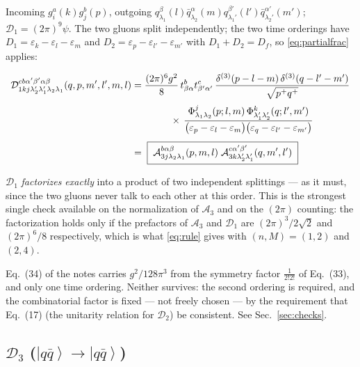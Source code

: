\documentclass[11pt]{article}
\newcommand{\eps}{\varepsilon}
\newcommand{\dthree}{\delta^{(3)}}
\newcommand{\ket}[1]{\left|#1\right\rangle}
\newcommand{\Ph}{\Phi}
\newcommand{\qk}[3]{q^{#1}_{#2}(#3)}
\newcommand{\aqk}[3]{\bar q^{#1}_{#2}(#3)}
\newcommand{\gl}[3]{g^{#1}_{#2}(#3)}
\begin{document}
Incoming $\gl{a}{i}{k}\gl{b}{j}{p}$, outgoing
$\qk{\beta}{\lambda_1}{l}\aqk{\alpha}{\lambda_2}{m}\qk{\beta'}{\lambda_1'}{l'}\aqk{\alpha'}{\lambda_2'}{m'}$;
$\mathcal D_{1}=(2\pi)^{9}\psi$. The two gluons split independently; the two time orderings have
$D_{1}=\eps_{k}-\eps_{l}-\eps_{m}$ and $D_{2}=\eps_{p}-\eps_{l'}-\eps_{m'}$ with
$D_{1}+D_{2}=D_{f}$, so \eqref{eq:partialfrac} applies:

\begin{res}
\begin{align}
\mathcal D^{cb\alpha'\beta'\alpha\beta}_{1kj\lambda_2'\lambda_1'\lambda_2\lambda_1}(q,p,m',l',m,l)
&=\frac{(2\pi)^{6}g^{2}}{8}\,t^{b}_{\beta\alpha}t^{c}_{\beta'\alpha'}\,
\frac{\dthree(p-l-m)\,\dthree(q-l'-m')}{\sqrt{p^{+}q^{+}}}
\nonumber\\[2pt]
&\hspace{1.4cm}\times\,
\frac{\Ph^{j}_{\lambda_1\lambda_2}(p;l,m)\,\Ph^{k}_{\lambda_1'\lambda_2'}(q;l',m')}
{\big(\eps_{p}-\eps_{l}-\eps_{m}\big)\big(\eps_{q}-\eps_{l'}-\eps_{m'}\big)}
\nonumber\\[4pt]
&=\;\boxed{\;\mathcal A^{b\alpha\beta}_{3j\lambda_2\lambda_1}(p,m,l)\;
\mathcal A^{c\alpha'\beta'}_{3k\lambda_2'\lambda_1'}(q,m',l')\;}
\label{eq:D1}
\end{align}
\end{res}

\noindent
$\mathcal D_1$ \emph{factorizes exactly} into a product of two independent splittings --- as it
must, since the two gluons never talk to each other at this order. This is the strongest single
check available on the normalization of $\mathcal A_3$ and on the $(2\pi)$ counting: the
factorization holds only if the prefactors of $\mathcal A_3$ and $\mathcal D_1$ are
$(2\pi)^{3}/2\sqrt2$ and $(2\pi)^{6}/8$ respectively, which is what \eqref{eq:rule} gives with
$(n,M)=(1,2)$ and $(2,4)$.

\begin{note}
Eq.~(34) of the notes carries $g^{2}/128\pi^{3}$ from the symmetry factor $\tfrac{1}{2!2!}$ of
Eq.~(33), and only one time ordering. Neither survives: the second ordering is required, and the
combinatorial factor is fixed --- not freely chosen --- by the requirement that Eq.~(17) (the
unitarity relation for $\mathcal D_2$) be consistent. See Sec.~\ref{sec:checks}.
\end{note}

\subsection{$\mathcal D_3$ ($\ket{q\bar q}\to\ket{q\bar q}$)}
\label{sec:D3}
\end{document}
